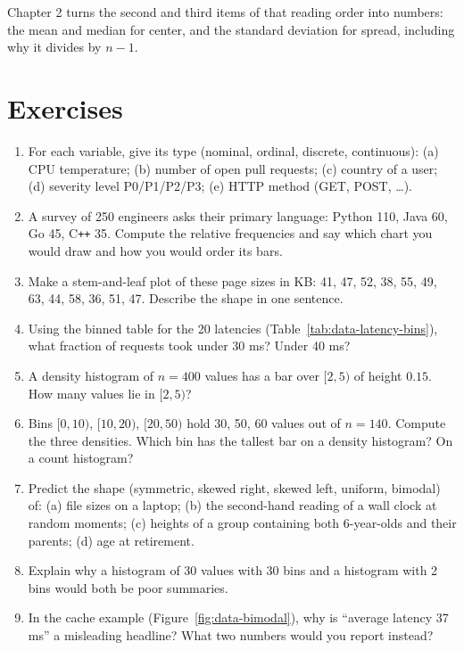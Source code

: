 Chapter 2 turns the second and third items of that reading order into numbers: the mean and
median for center, and the standard deviation for spread, including why it divides by $n-1$.

\section{Exercises}
\label{sec:data-exercises}

\begin{enumerate}
  \item For each variable, give its type (nominal, ordinal, discrete, continuous): (a) CPU
  temperature; (b) number of open pull requests; (c) country of a user; (d) severity level
  P0/P1/P2/P3; (e) HTTP method (GET, POST, \dots).
  \item A survey of 250 engineers asks their primary language: Python 110, Java 60, Go 45,
  C\texttt{++} 35. Compute the relative frequencies and say which chart you would draw and how
  you would order its bars.
  \item Make a stem-and-leaf plot of these page sizes in KB: 41, 47, 52, 38, 55, 49, 63, 44,
  58, 36, 51, 47. Describe the shape in one sentence.
  \item Using the binned table for the 20 latencies (Table~\ref{tab:data-latency-bins}), what
  fraction of requests took under 30 ms? Under 40 ms?
  \item A density histogram of $n=400$ values has a bar over $[2,5)$ of height $0.15$. How many
  values lie in $[2,5)$?
  \item Bins $[0,10)$, $[10,20)$, $[20,50)$ hold 30, 50, 60 values out of $n = 140$. Compute the
  three densities. Which bin has the tallest bar on a density histogram? On a count histogram?
  \item Predict the shape (symmetric, skewed right, skewed left, uniform, bimodal) of: (a) file
  sizes on a laptop; (b) the second-hand reading of a wall clock at random moments; (c) heights
  of a group containing both 6-year-olds and their parents; (d) age at retirement.
  \item Explain why a histogram of 30 values with 30 bins and a histogram with 2 bins would both
  be poor summaries.
  \item In the cache example (Figure~\ref{fig:data-bimodal}), why is ``average latency 37 ms''
  a misleading headline? What two numbers would you report instead?
\end{enumerate}

